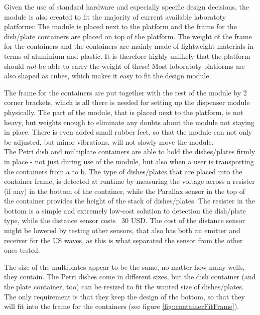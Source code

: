 \documentclass[10pt,a4paper]{article}
\begin{document}
		Given the use of standard hardware and especially specific design decisions, the module is also created to fit the majority of current available laboratoty platforms: The module is placed next to the platform and the frame for the dish/plate containers are placed on top of the platform. The weight of the frame for the containers and the containers are mainly made of lightweight materials in terms of aluminium and plastic. It is therefore highly unlikely that the platform should \textit{not} be able to carry the weight of these! Most loboratoty platforms are also shaped as cubes, which makes it easy to fit the design module.
		
		The frame for the containers are put together with the rest of the module by 2 corner brackets, which is all there is needed for setting up the dispenser module physically. The part of the module, that is placed next to the platform, is not heavy, but weights enough to eliminate any doubts about the module not staying in place. There is even added small rubber feet, so that the module can not only be adjusted, but minor vibrations, will not slowly move the module.\\
		
		The Petri dish and multiplate containers are able to hold the dishes/plates firmly in place - not just during use of the module, but also when a user is transporting the containers from a to b. The type of dishes/plates that are placed into the container frame, is detected at runtime by measuring the voltage across a resister (if any) in the bottom of the container, while the Parallax sensor in the top of the container provides the height of the stack of dishes/plates. The resister in the bottom is a simple and extremely low-cost solution to detection the dish/plate type, while the distance sensor costs ~30 USD. The cost of the distance sensor might be lowered by testing other sensors, that also has both an emitter and receiver for the US waves, as this is what separated the sensor from the other ones tested.
		
		
				
		The size of the multiplates appear to be the same, no-matter how many wells, they contain. The Petri dishes come in different sizes, but the dish container (and the plate container, too) can be resized to fit the wanted size of dishes/plates. The only requirement is that they keep the design of the bottom, so that they will fit into the frame for the containers (see figure \ref{fig::containerFitFrame}). \\
		
\end{document}
